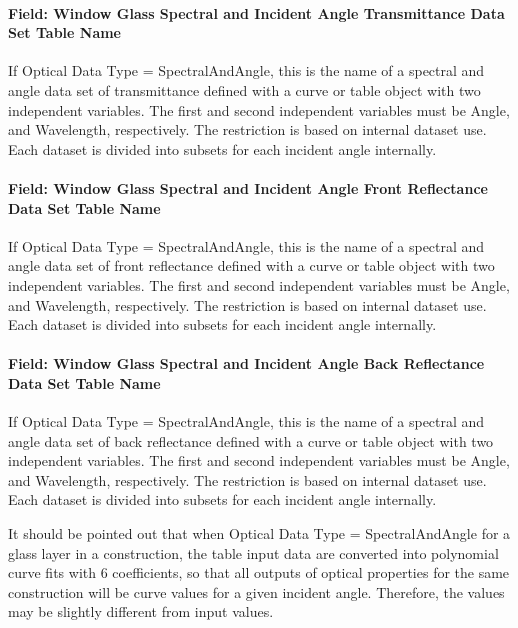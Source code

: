 \paragraph{Field: Window Glass Spectral and Incident Angle Transmittance Data Set Table Name}\label{field-window-glass-spectral-and-incident-angle-transmittance-data}

If Optical Data Type = SpectralAndAngle, this is the name of a spectral and angle data set of transmittance defined with a curve or table object with two independent variables. The first and second independent variables must be Angle, and Wavelength, respectively. The restriction is based on internal dataset use. Each dataset is divided into subsets for each incident angle internally.

\paragraph{Field: Window Glass Spectral and Incident Angle Front Reflectance Data Set Table Name}\label{field-window-glass-spectral-and-incident-angle-front-reflectance-data}

If Optical Data Type = SpectralAndAngle, this is the name of a spectral and angle data set of front reflectance defined with a curve or table object with two independent variables. The first and second independent variables must be Angle, and Wavelength, respectively. The restriction is based on internal dataset use. Each dataset is divided into subsets for each incident angle internally.

\paragraph{Field: Window Glass Spectral and Incident Angle Back Reflectance Data Set Table Name}\label{field-window-glass-spectral-and-incident-angle-back-reflectance-data}

If Optical Data Type = SpectralAndAngle, this is the name of a spectral and angle data set of back reflectance defined with a curve or table object with two independent variables. The first and second independent variables must be Angle, and Wavelength, respectively. The restriction is based on internal dataset use. Each dataset is divided into subsets for each incident angle internally.

It should be pointed out that when Optical Data Type = SpectralAndAngle for a glass layer in a construction, the table input data are converted into polynomial curve fits with 6 coefficients, so that all outputs of optical properties for the same construction will be curve values for a given incident angle. Therefore, the values may be slightly different from input values.

